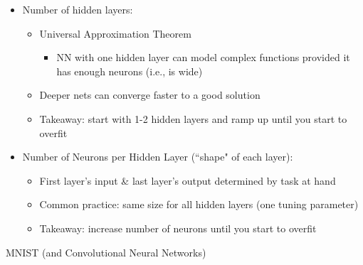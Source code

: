 \documentclass[10pt, oneside]{article}
\begin{document}
\begin{itemize}
    \item Number of hidden layers:
    \begin{itemize}
        \item Universal Approximation Theorem
        \begin{itemize}
            \item NN with one hidden layer can model complex functions provided it has enough neurons (i.e., is wide)
        \end{itemize}
        \item Deeper nets can converge faster to a good solution
        \item Takeaway: start with 1-2 hidden layers and ramp up until you start to overfit
    \end{itemize}
    \item Number of Neurons per Hidden Layer (``shape" of each layer):
    \begin{itemize}
        \item First layer's input \& last layer's output determined by task at hand
        \item Common practice: same size for all hidden layers (one tuning parameter)
        \item Takeaway: increase number of neurons until you start to overfit
    \end{itemize}
\end{itemize}
MNIST (and Convolutional Neural Networks)
\end{document}
